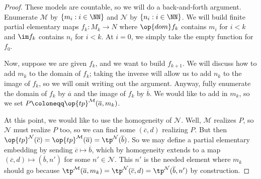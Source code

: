 \documentclass[../notes.tex]{subfiles}
\begin{document}
\begin{proof}
	These models are countable, so we will do a back-and-forth argument. Enumerate $\mathcal M$ by $\{m_i:i\in\NN\}$ and $\mathcal N$ by $\{n_i:i\in\NN\}$. We will build finite partial elementary maps $f_k\colon M_k\to N$ where $\op{dom}f_k$ contains $m_i$ for $i<k$ and $\im f_k$ contains $n_i$ for $i<k$. At $i=0$, we simply take the empty function for $f_0$.

	Now, suppose we are given $f_k$, and we want to build $f_{k+1}$. We will discuss how to add $m_k$ to the domain of $f_k$; taking the inverse will allow us to add $n_k$ to the image of $f_k$, so we will omit writing out the argument. Anyway, fully enumerate the domain of $f_k$ by $\overline a$ and the image of $f_k$ by $\overline b$. We would like to add in $m_k$, so we set $P\coloneqq\op{tp}^\mathcal M(\overline a,m_k)$.

	At this point, we would like to use the homogeneity of $\mathcal N$. Well, $\mathcal M$ realizes $P$, so $\mathcal N$ must realize $P$ too, so we can find some $(\overline c,d)$ realizing $P$. But then $\op{tp}^\mathcal N(\overline c)=\op{tp}^\mathcal M(\overline a)=\tp^\mathcal N(\overline b)$. So we may define a partial elementary embedding by sending $\overline c\mapsto\overline b$, which by homogeneity extends to a map $(\overline c,d)\mapsto(\overline b,n')$ for some $n'\in\mathcal N$. This $n'$ is the needed element where $m_k$ should go because $\tp^\mathcal M(\overline a,m_k)=\tp^\mathcal N(\overline c,d)=\tp^\mathcal N(\overline b,n')$ by construction.
\end{proof}
\end{document}
